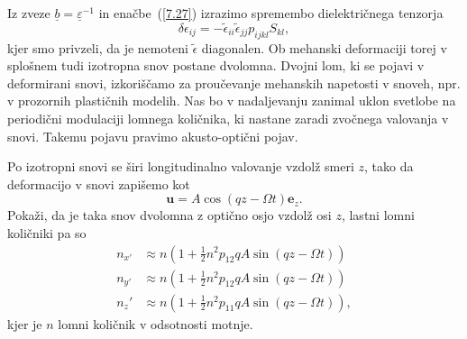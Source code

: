 Iz zveze $\underline{b} = \underline{\varepsilon}^{-1}$ in enačbe~(\ref{7.27}) izrazimo
spremembo dielektričnega tenzorja 
\begin{equation}
\delta\epsilon_{ij}=-\tilde{\epsilon}_{ii}\tilde{\epsilon}_{jj}p_{ijkl}S_{kl},
\label{7.29}
\end{equation}
kjer smo privzeli, da je nemoteni $\tilde{\epsilon}$ diagonalen. Ob mehanski deformaciji
torej v splošnem tudi izotropna snov postane dvolomna.
Dvojni lom, ki se pojavi v deformirani snovi, izkoriščamo za proučevanje
mehanskih napetosti v snoveh, npr. v prozornih plastičnih modelih. 
Nas bo v nadaljevanju zanimal uklon  svetlobe na periodični
modulaciji lomnega količnika, ki nastane zaradi zvočnega valovanja v snovi. Takemu pojavu
pravimo akusto-optični pojav.

\begin{definition}
\label{nalogaAO}
Po izotropni snovi se širi longitudinalno valovanje vzdolž smeri $z$, tako da 
deformacijo v snovi zapišemo kot
\begin{equation}
\mathbf{u} = A \cos(q z - \Omega t)\mathbf{e}_z.
\end{equation}
Pokaži, da je taka snov dvolomna z optično osjo vzdolž osi $z$, lastni 
lomni količniki pa so 
\begin{align}
n_{x'} &\approx n\left(1+\frac{1}{2}n^2p_{12}q A \sin (q z - \Omega t)\right)\\
n_{y'} &\approx n\left(1+\frac{1}{2}n^2p_{12}q A \sin (q z - \Omega t)\right)\\
n_z' &\approx n\left(1+\frac{1}{2}n^2p_{11}q A \sin (q z - \Omega t)\right),
\end{align}
kjer je $n$ lomni količnik v odsotnosti motnje.
\end{definition}

